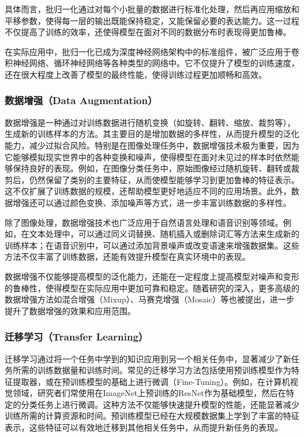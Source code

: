 具体而言，批归一化通过对每个小批量的数据进行标准化处理，然后再应用缩放和平移参数，使得每一层的输出既能保持稳定，又能保留必要的表达能力。这一过程不仅提高了训练的效率，还使得模型在面对不同的数据分布时表现得更加鲁棒。

在实际应用中，批归一化已成为深度神经网络架构中的标准组件，被广泛应用于卷积神经网络、循环神经网络等各种类型的网络中。它不仅提升了模型的训练速度，还在很大程度上改善了模型的最终性能，使得训练过程更加顺畅和高效。

\subsubsection{数据增强（Data Augmentation）}

数据增强是一种通过对训练数据进行随机变换（如旋转、翻转、缩放、裁剪等），生成新的训练样本的方法。其主要目的是增加数据的多样性，从而提升模型的泛化能力，减少过拟合风险。特别是在图像处理任务中，数据增强技术极为重要，因为它能够模拟现实世界中的各种变换和噪声，使得模型在面对未见过的样本时依然能够保持良好的表现。例如，在图像分类任务中，原始图像经过随机旋转、翻转或裁剪后，仍然保留了类别的主要特征，从而使模型能够学习到更加鲁棒的特征表示。这不仅扩展了训练数据的规模，还帮助模型更好地适应不同的应用场景。此外，数据增强还可以通过颜色变换、添加噪声等方式，进一步丰富训练数据的多样性。

除了图像处理，数据增强技术也广泛应用于自然语言处理和语音识别等领域。例如，在文本处理中，可以通过同义词替换、随机插入或删除词汇等方法来生成新的训练样本；在语音识别中，可以通过添加背景噪声或改变语速来增强数据集。这些方法不仅丰富了训练数据，还能有效提升模型在真实环境中的表现。

数据增强不仅能够提高模型的泛化能力，还能在一定程度上提高模型对噪声和变形的鲁棒性，使得模型在实际应用中更加可靠和稳定。随着研究的深入，更多高级的数据增强方法如混合增强（Mixup）、马赛克增强（Mosaic）等也被提出，进一步提升了数据增强的效果和应用范围。

\subsubsection{迁移学习（Transfer Learning）}

迁移学习通过将一个任务中学到的知识应用到另一个相关任务中，显著减少了新任务所需的训练数据量和训练时间。常见的迁移学习方法包括使用预训练模型作为特征提取器，或在预训练模型的基础上进行微调（Fine-Tuning）。例如，在计算机视觉领域，研究者们常使用在ImageNet上预训练的ResNet作为基础模型，然后在特定的分类任务上进行微调。这种方法不仅能够快速提升模型的性能，还能显著减少训练所需的计算资源和时间。预训练模型已经在大规模数据集上学到了丰富的特征表示，这些特征可以有效地迁移到其他相关任务中，从而提升新任务的表现。

